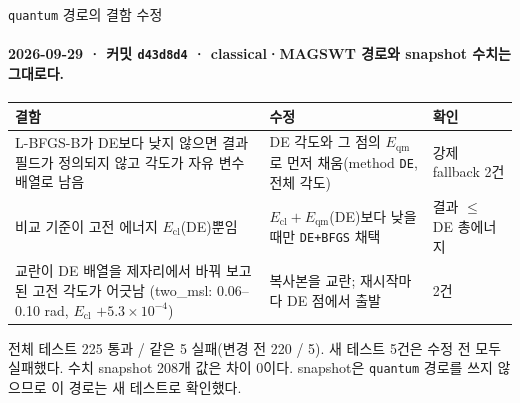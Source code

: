\begin{frame}[label=quantum-fix]{\texttt{quantum} 경로의 결함 수정}
  \framesubtitle{2026-09-29 · 커밋 \texttt{d43d8d4} · classical·MAGSWT 경로와 snapshot 수치는 그대로다.}
  \small
  \begin{tabularx}{\textwidth}{@{}YYp{3.3cm}@{}}
    \toprule
    결함 & 수정 & 확인 \\
    \midrule
    L-BFGS-B가 DE보다 낮지 않으면 결과 필드가 정의되지 않고 각도가 자유 변수 배열로 남음
      & DE 각도와 그 점의 $E_{\mathrm{qm}}$로 먼저 채움(method \texttt{DE}, 전체 각도)
      & 강제 fallback 2건 \\
    비교 기준이 고전 에너지 $E_{\mathrm{cl}}$(DE)뿐임
      & $E_{\mathrm{cl}}+E_{\mathrm{qm}}$(DE)보다 낮을 때만 \texttt{DE+BFGS} 채택
      & 결과 $\le$ DE 총에너지 \\
    교란이 DE 배열을 제자리에서 바꿔 보고된 고전 각도가 어긋남
      (two\_msl: 0.06--0.10 rad, $E_{\mathrm{cl}}$ $+5.3\times10^{-4}$)
      & 복사본을 교란; 재시작마다 DE 점에서 출발
      & 2건 \\
    \bottomrule
  \end{tabularx}
  \par\medskip
  전체 테스트 225 통과 / 같은 5 실패(변경 전 220 / 5). 새 테스트 5건은 수정 전 모두 실패했다.
  수치 snapshot 208개 값은 차이 0이다. snapshot은 \texttt{quantum} 경로를 쓰지 않으므로 이 경로는 새 테스트로 확인했다.
  \par\medskip
\end{frame}

